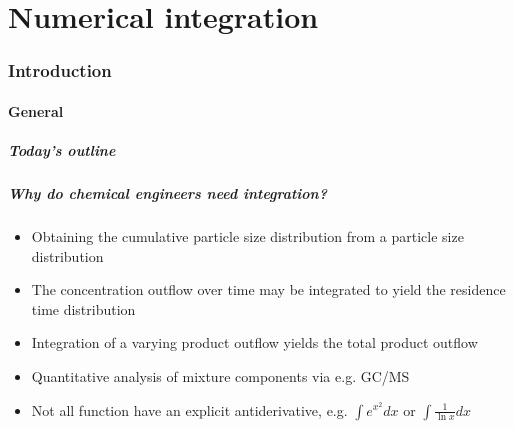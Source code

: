 \part{Numerical integration}
\section{Introduction}
\subsection*{General}
\begin{frame}[label=contents_integration]
  \frametitle{Today's outline}
\end{frame}

\begin{frame}
  \frametitle{Why do chemical engineers need integration?}
  \begin{itemize}
     \item Obtaining the cumulative particle size distribution from a particle size distribution
     \item The concentration outflow over time may be integrated to yield the residence time distribution
     \item Integration of a varying product outflow yields the total product outflow
     \item Quantitative analysis of mixture components via e.g. GC/MS
     \item Not all function have an explicit antiderivative, e.g. $\int e^{x^2} dx$ or $\int \frac{1}{\ln x}dx$
  \end{itemize}
\end{frame}


